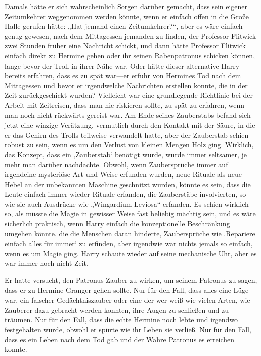 Damals hätte er sich wahrscheinlich Sorgen darüber gemacht, dass sein eigener Zeitumkehrer weggenommen werden könnte, wenn er einfach offen in die Große Halle gerufen hätte: „Hat jemand einen Zeitumkehrer?“, aber es wäre einfach genug gewesen, nach dem Mittagessen jemanden zu finden, der Professor Flitwick zwei Stunden früher eine Nachricht schickt, und dann hätte Professor Flitwick einfach direkt zu Hermine gehen oder ihr seinen Rabenpatronus schicken können, lange bevor der Troll in ihrer Nähe war. Oder hätte dieser alternative Harry bereits erfahren, dass es zu spät war—er erfuhr von Hermines Tod nach dem Mittagessen und bevor er irgendwelche Nachrichten erstellen konnte, die in der Zeit zurückgeschickt wurden? Vielleicht war eine grundlegende Richtlinie bei der Arbeit mit Zeitreisen, dass man nie riskieren sollte, zu spät zu erfahren, wenn man noch nicht rückwärts gereist war.
Am Ende seines Zauberstabs befand sich jetzt eine winzige Verätzung, vermutlich durch den Kontakt mit der Säure, in die er das Gehirn des Trolls teilweise verwandelt hatte, aber der Zauberstab schien robust zu sein, wenn es um den Verlust von kleinen Mengen Holz ging. Wirklich, das Konzept, dass ein ‚Zauberstab‘ benötigt wurde, wurde immer seltsamer, je mehr man darüber nachdachte. Obwohl, wenn Zaubersprüche immer auf irgendeine mysteriöse Art und Weise erfunden wurden, neue Rituale als neue Hebel an der unbekannten Maschine geschnitzt wurden, könnte es sein, dass die Leute einfach immer wieder Rituale erfanden, die Zauberstäbe involvierten, so wie sie auch Ausdrücke wie „Wingardium Leviosa“ erfanden. Es schien wirklich so, als müsste die Magie in gewisser Weise fast beliebig mächtig sein, und es wäre sicherlich praktisch, wenn Harry einfach die konzeptionelle Beschränkung umgehen könnte, die die Menschen daran hinderte, Zaubersprüche wie ‚Repariere einfach alles für immer‘ zu erfinden, aber irgendwie war nichts jemals so einfach, wenn es um Magie ging.
Harry schaute wieder auf seine mechanische Uhr, aber es war immer noch nicht Zeit.

Er hatte versucht, den Patronus-Zauber zu wirken, um seinem Patronus zu sagen, dass er zu Hermine Granger gehen sollte. Nur für den Fall, dass alles eine Lüge war, ein falscher Gedächtniszauber oder eine der wer-weiß-wie-vielen Arten, wie Zauberer dazu gebracht werden konnten, ihre Augen zu schließen und zu träumen. Nur für den Fall, dass die echte Hermine noch lebte und irgendwo festgehalten wurde, obwohl er spürte wie ihr Leben sie verließ. Nur für den Fall, dass es ein Leben nach dem Tod gab und der Wahre Patronus es erreichen konnte.

